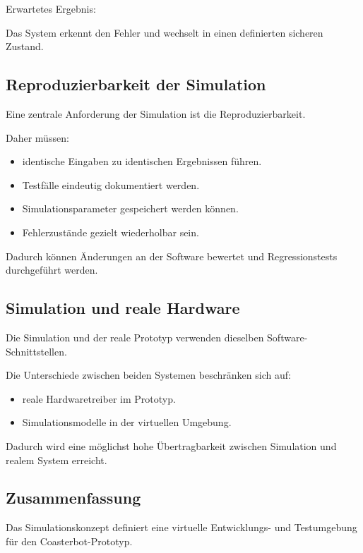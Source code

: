 Erwartetes Ergebnis:

Das System erkennt den Fehler und wechselt in einen definierten sicheren
Zustand.

\subsection{Reproduzierbarkeit der
Simulation}\label{reproduzierbarkeit-der-simulation}

Eine zentrale Anforderung der Simulation ist die Reproduzierbarkeit.

Daher müssen:

\begin{itemize}
\tightlist
\item
  identische Eingaben zu identischen Ergebnissen führen.
\item
  Testfälle eindeutig dokumentiert werden.
\item
  Simulationsparameter gespeichert werden können.
\item
  Fehlerzustände gezielt wiederholbar sein.
\end{itemize}

Dadurch können Änderungen an der Software bewertet und Regressionstests
durchgeführt werden.

\subsection{Simulation und reale
Hardware}\label{simulation-und-reale-hardware}

Die Simulation und der reale Prototyp verwenden dieselben
Software-Schnittstellen.

Die Unterschiede zwischen beiden Systemen beschränken sich auf:

\begin{itemize}
\tightlist
\item
  reale Hardwaretreiber im Prototyp.
\item
  Simulationsmodelle in der virtuellen Umgebung.
\end{itemize}

Dadurch wird eine möglichst hohe Übertragbarkeit zwischen Simulation und
realem System erreicht.

\subsection{Zusammenfassung}\label{zusammenfassung-4}

Das Simulationskonzept definiert eine virtuelle Entwicklungs- und
Testumgebung für den Coasterbot-Prototyp.

